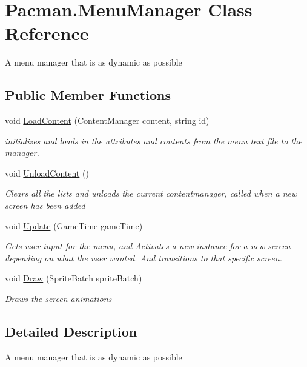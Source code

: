\hypertarget{class_pacman_1_1_menu_manager}{\section{Pacman.\-Menu\-Manager Class Reference}
\label{class_pacman_1_1_menu_manager}
}


A menu manager that is as dynamic as possible  


\subsection*{Public Member Functions}
\begin{DoxyCompactItemize}
\item 
void \hyperlink{class_pacman_1_1_menu_manager_af7008f3b4b1865fc3550336bcccb2bea}{Load\-Content} (Content\-Manager content, string id)
\begin{DoxyCompactList}\small\item\em initializes and loads in the attributes and contents from the menu text file to the manager. \end{DoxyCompactList}\item 
void \hyperlink{class_pacman_1_1_menu_manager_ab48258dd7d618e8e9dbd50229e5da01e}{Unload\-Content} ()
\begin{DoxyCompactList}\small\item\em Clears all the lists and unloads the current contentmanager, called when a new screen has been added \end{DoxyCompactList}\item 
void \hyperlink{class_pacman_1_1_menu_manager_a72d787f7a1545e1b6af8c70cd70e5e95}{Update} (Game\-Time game\-Time)
\begin{DoxyCompactList}\small\item\em Gets user input for the menu, and Activates a new instance for a new screen depending on what the user wanted. And transitions to that specific screen. \end{DoxyCompactList}\item 
void \hyperlink{class_pacman_1_1_menu_manager_a08d0a81648d1d326553435266a5eb488}{Draw} (Sprite\-Batch sprite\-Batch)
\begin{DoxyCompactList}\small\item\em Draws the screen animations \end{DoxyCompactList}\end{DoxyCompactItemize}


\subsection{Detailed Description}
A menu manager that is as dynamic as possible 



